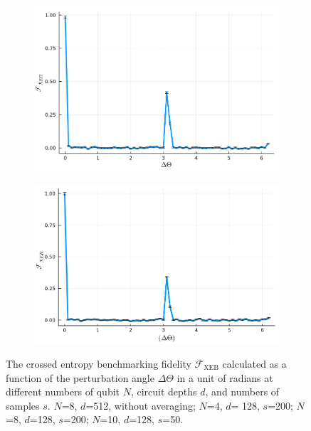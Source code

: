 \documentclass[12pt]{article}
\begin{document}
\begin{figure}[t]
	\begin{subfigure}[t]{0.42\textwidth}
		\centering
		\includegraphics[width=\linewidth]
		{figures/Task4b_N_8_d_128_s_200}
		\subcaption{\label{fig:task4b_N8}}
	\end{subfigure}%
	\begin{subfigure}[t]{0.42\textwidth}
		\centering
		\includegraphics[width=\linewidth]
		{figures/Task4b_N_10_d_128_s_50_fg}
		\subcaption{\label{fig:task4b_N10}}
	\end{subfigure}%
	\caption{
		The crossed entropy benchmarking fidelity $\mathcal{F}_\mathrm{XEB}$ calculated as a function of the perturbation angle $\Delta \Theta$ in a unit of radians at different numbers of qubit $N$, circuit depths $d$, and numbers of samples $s$.  $N$=8, $d$=512, without averaging;  $N$=4, $d$= 128, $s$=200;  $N$=8, $d$=128, $s$=200;  $N$=10, $d$=128, $s$=50.
	}
	\label{fig:XEBfidelity}
\end{figure}
\end{document}
